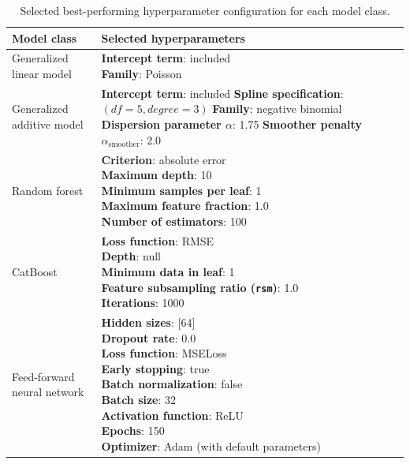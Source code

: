 \begin{table}[ht]
\centering
\small
\caption{Selected best-performing hyperparameter configuration for each model class. }
\label{tab:best-hyperparameters}
\begin{tabular}{p{} p{}}
\toprule
\textbf{Model class} & \textbf{Selected hyperparameters} \\
\midrule

Generalized linear model 
& \makecell[l]{
\textbf{Intercept term}: included \\
\textbf{Family}: Poisson \\
} \\

\midrule

Generalized additive model 
& \makecell[l]{
\textbf{Intercept term}: included \\
\textbf{Spline specification}: \((df=5, degree=3)\) \\
\textbf{Family}: negative binomial \\
\textbf{Dispersion parameter \(\alpha\)}: 1.75 \\
\textbf{Smoother penalty \(\alpha_{\text{smoother}}\)}: 2.0
} \\

\midrule

Random forest 
& \makecell[l]{
\textbf{Criterion}: absolute error \\
\textbf{Maximum depth}: 10 \\
\textbf{Minimum samples per leaf}: 1 \\
\textbf{Maximum feature fraction}: 1.0 \\
\textbf{Number of estimators}: 100
} \\

\midrule

CatBoost 
& \makecell[l]{
\textbf{Loss function}: RMSE \\
\textbf{Depth}: null \\
\textbf{Minimum data in leaf}: 1 \\
\textbf{Feature subsampling ratio (\texttt{rsm})}: 1.0 \\
\textbf{Iterations}: 1000
} \\

\midrule

Feed-forward neural network 
& \makecell[l]{
\textbf{Hidden sizes}: [64] \\
\textbf{Dropout rate}: 0.0 \\
\textbf{Loss function}: MSELoss \\
\textbf{Early stopping}: true \\
\textbf{Batch normalization}: false \\
\textbf{Batch size}: 32 \\
\textbf{Activation function}: ReLU \\
\textbf{Epochs}: 150 \\
\textbf{Optimizer}: Adam (with default parameters) 
} \\

\bottomrule
\end{tabular}
\end{table}


